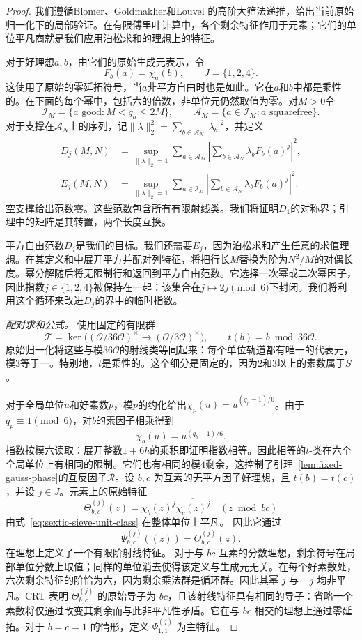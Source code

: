 \documentclass[11pt,a4paper]{article}
\numberwithin{equation}{section}
\numberwithin{figure}{section}
\theoremstyle{definition}
\theoremstyle{remark}
\begin{document}
\begin{proof}
我们遵循Blomer、Goldmakher和Louvel \cite[Section~3]{BGL}的高阶大筛法递推，给出当前原始归一化下的局部验证。在有限傅里叶计算中，各个剩余特征作用于元素；它们的单位平凡商就是我们应用泊松求和的理想上的特征。

对于好理想$a,b$，由它们的原始生成元表示，令
\[
 F_b(a)=\chi_a(b),\qquad J=\{1,2,4\}.
\]
这使用了原始的零延拓符号，当$a$非平方自由时也是如此。它在$a$和$b$中都是乘性的。在下面的每个幂中，包括六的倍数，非单位元仍然取值为零。对$M>0$令
\[
 \mathcal I_M=\{a\text{ good}:M<q_a\le2M\},\qquad
 \mathcal A_M=\{a\in\mathcal I_M:a\text{ squarefree}\}.
\]
对于支撑在$\mathcal A_N$上的序列，记$\|\lambda\|_2^2=\sum_{b\in\mathcal A_N}|\lambda_b|^2$，并定义
\begin{align*}
 D_j(M,N)&=\sup_{\|\lambda\|_2=1}
  \sum_{a\in\mathcal A_M}
  \left|\sum_{b\in\mathcal A_N}\lambda_bF_b(a)^j\right|^2,\\
 E_j(M,N)&=\sup_{\|\lambda\|_2=1}
  \sum_{a\in\mathcal I_M}
  \left|\sum_{b\in\mathcal A_N}\lambda_bF_b(a)^j\right|^2.
\end{align*}
空支撑给出范数零。这些范数包含所有有限射线类。我们将证明$D_1$的对称界；引理中的矩阵是其转置，两个长度互换。

平方自由范数$D_j$是我们的目标。我们还需要$E_j$，因为泊松求和产生任意的求值理想。在其定义和中展开平方并配对列特征，将把行长$M$替换为阶为$N^2/M$的对偶长度。幂分解随后将无限制行和返回到平方自由范数。它选择一次幂或二次幂因子，因此指数$j\in\{1,2,4\}$被保持在一起：该集合在$j\mapsto2j\pmod6$下封闭。我们将利用这个循环来改进$D_j$的界中的临时指数。

\medskip\noindent\emph{配对求和公式。}
使用固定的有限群
\[
 \mathcal T=\ker\bigl((\mathcal O/36\mathcal O)^\times
              \longrightarrow(\mathcal O/3\mathcal O)^\times\bigr),
 \qquad t(b)=b\bmod36\mathcal O.
\]
原始归一化将这些与模$36\mathcal O$的射线类等同起来：每个单位轨道都有唯一的代表元，模$3$等于一。特别地，$t$是乘性的。这个细分是固定的，因为$2$和$3$以上的素数属于$S$。

对于全局单位$u$和好素数$p$，模$p$的约化给出$\chi_p(u)=u^{(q_p-1)/6}$。由于$q_p\equiv1\pmod6$，对$b$的素因子相乘得到
\begin{equation}\label{eq:sextic-sieve-unit-class}
 \chi_b(u)=u^{(q_b-1)/6}.
\end{equation}
指数按模六读取：展开整数$1+6h$的乘积即证明指数相等。因此相等的$t$-类在六个全局单位上有相同的限制。它们也有相同的模$4$剩余，这控制了引理~\ref{lem:fixed-gauss-phase}的互反因子$\mathcal R$。设 $b,c$ 为互素的无平方因子好理想，且 $t(b)=t(c)$，并设
$j\in J$。元素上的原始特征
\[
 \Theta_{b,c}^{(j)}(z)=\chi_b(z)^j\overline{\chi_c(z)^j}
       \quad (z\bmod bc)
\]
由式~\eqref{eq:sextic-sieve-unit-class} 在整体单位上平凡。
因此它通过
\[
 \Psi_{b,c}^{(j)}((z))=\Theta_{b,c}^{(j)}(z).
\]
在理想上定义了一个有限阶射线特征。
对于与 $bc$ 互素的分数理想，剩余符号在局部单位分数上取值；同样的单位消去使得该定义与生成元无关。在每个好素数处，六次剩余特征的阶恰为六，因为剩余乘法群是循环群。因此其幂 $j$ 与 $-j$ 均非平凡。CRT 表明
$\Theta_{b,c}^{(j)}$ 的原始导子为 $bc$，且该射线特征具有相同的导子：省略一个素数将仅通过改变其剩余而与此非平凡性矛盾。它在与 $bc$ 相交的理想上通过零延拓。对于 $b=c=1$ 的情形，定义 $\Psi_{1,1}^{(j)}$ 为主特征。


\end{proof}
\end{document}
